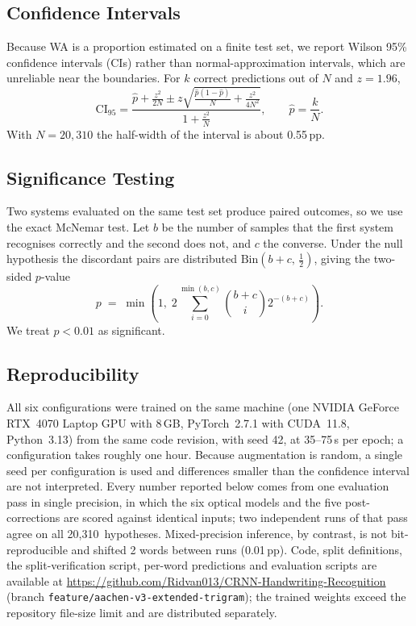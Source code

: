 \documentclass[conference]{IEEEtran}
\newcommand{\nsamples}{20{,}310}
\begin{document}
\subsection{Confidence Intervals}
Because WA is a proportion estimated on a finite test set, we report
Wilson 95\% confidence intervals (CIs) rather than
normal-approximation intervals, which are unreliable near the
boundaries. For $k$ correct predictions out of $N$ and $z=1.96$,
\begin{equation}
\mathrm{CI}_{95} =
\frac{\hat{p}+\frac{z^{2}}{2N} \pm
      z\sqrt{\frac{\hat{p}(1-\hat{p})}{N}+\frac{z^{2}}{4N^{2}}}}
     {1+\frac{z^{2}}{N}},
\qquad \hat{p}=\frac{k}{N}.
\label{eq:wilson}
\end{equation}
With $N=\nsamples$ the half-width of the interval is about 0.55\,pp.

\subsection{Significance Testing}
Two systems evaluated on the same test set produce paired outcomes, so
we use the exact McNemar test. Let $b$ be the number of samples that
the first system recognises correctly and the second does not, and $c$
the converse. Under the null hypothesis the discordant pairs are
distributed $\mathrm{Bin}(b+c,\,\tfrac{1}{2})$, giving the two-sided
$p$-value
\begin{equation}
p \;=\; \min\!\left(1,\;
   2\sum_{i=0}^{\min(b,c)} \binom{b+c}{i} 2^{-(b+c)}\right).
\label{eq:mcnemar}
\end{equation}
We treat $p<0.01$ as significant.

\subsection{Reproducibility}
All six configurations were trained on the same machine (one NVIDIA
GeForce RTX~4070 Laptop GPU with 8\,GB, PyTorch~2.7.1 with CUDA~11.8,
Python~3.13) from the same code revision, with seed 42, at 35--75\,s per
epoch; a configuration takes roughly one hour. Because augmentation is
random, a single seed per configuration is used and differences
smaller than the confidence interval are not interpreted. Every number
reported below comes from one evaluation pass in single precision, in
which the six optical models and the five post-corrections are scored
against identical inputs; two independent runs of that pass agree on
all \nsamples\ hypotheses. Mixed-precision inference, by contrast, is
not bit-reproducible and shifted 2 words between runs (0.01\,pp). Code, split
definitions, the split-verification script, per-word predictions and
evaluation scripts are available at
\url{https://github.com/Ridvan013/CRNN-Handwriting-Recognition}
(branch \texttt{feature/aachen-v3-extended-trigram}); the trained
weights exceed the repository file-size limit and are distributed
separately.
\end{document}
